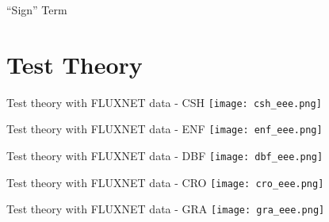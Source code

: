\documentclass{beamer}
\begin{document}
\begin{frame}{``Sign'' Term}
  \begin{figure}
  \end{figure}
\end{frame}


\section{Test Theory}
    \begin{frame}{Test theory with FLUXNET data - CSH}
                \texttt{[image: csh\_eee.png]}
     \end{frame}


    \begin{frame}{Test theory with FLUXNET data - ENF}
                \texttt{[image: enf\_eee.png]}
     \end{frame}


    \begin{frame}{Test theory with FLUXNET data - DBF}
                \texttt{[image: dbf\_eee.png]}
     \end{frame}

    \begin{frame}{Test theory with FLUXNET data - CRO}
                \texttt{[image: cro\_eee.png]}
     \end{frame}

    \begin{frame}{Test theory with FLUXNET data - GRA}
                \texttt{[image: gra\_eee.png]}
     \end{frame}



\end{document}
